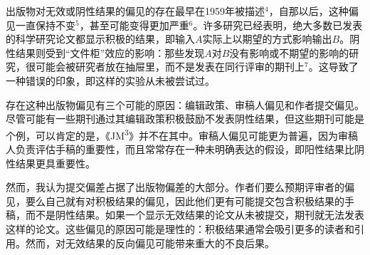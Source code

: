 出版物对无效或阴性结果的偏见的存在最早在1959年被描述$^{4}$，自那以后，这种偏见一直保持不变$^{5}$，甚至可能变得更加严重$^{6}$。许多研究已经表明，绝大多数已发表的科学研究论文都显示积极的结果，即输入$A$实际上以期望的方式影响输出$B$。阴性结果则受到“文件柜”效应的影响：那些发现$A$对$B$没有影响或不期望的影响的研究，很可能会被研究者放在抽屉里，而不是发表在同行评审的期刊上$^{7}$。这导致了一种错误的印象，即这样的实验从未被尝试过。

存在这种出版物偏见有三个可能的原因：编辑政策、审稿人偏见和作者提交偏见。尽管可能有一些期刊通过其编辑政策积极鼓励不发表阴性结果，但这些期刊可能是个例，可以肯定的是，《JM\textsuperscript{3}》并不在其中。审稿人偏见可能更为普遍，因为审稿人负责评估手稿的重要性，而且常常存在一种未明确表达的假设，即阳性结果比阴性结果更具重要性。

然而，我认为提交偏差占据了出版物偏差的大部分。作者们要么预期评审者的偏见，要么自己就有对积极结果的偏见，因此他们更有可能提交包含积极结果的手稿，而不是阴性结果。如果一个显示无效结果的论文从未被提交，期刊就无法发表这样的论文。这些偏见的原因可能是理性的：积极结果通常会吸引更多的读者和引用。然而，对无效结果的反向偏见可能带来重大的不良后果。

